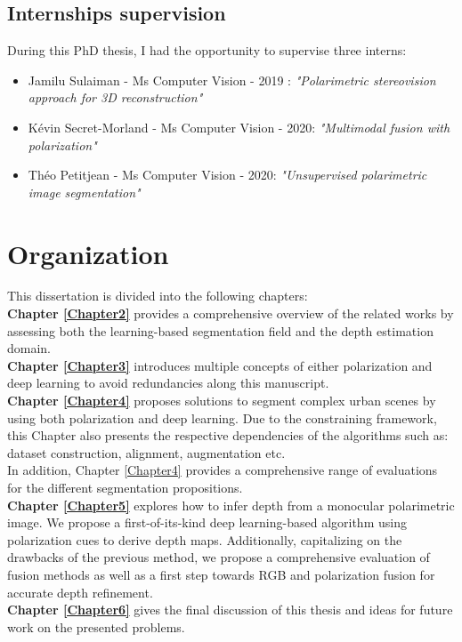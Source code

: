 \subsection{Internships supervision}
During this PhD thesis, I had the opportunity to supervise three interns:
\begin{itemize}
	\item Jamilu Sulaiman - Ms Computer Vision - 2019 : \textit{"Polarimetric stereovision approach for 3D reconstruction"}
	\item K{\'e}vin Secret-Morland - Ms Computer Vision - 2020: \textit{"Multimodal fusion with polarization"}
	\item Th{\'e}o Petitjean - Ms Computer Vision - 2020: \textit{"Unsupervised polarimetric image segmentation"}
\end{itemize}

\section{Organization}
This dissertation is divided into the following chapters:\\
\textbf{Chapter \ref{Chapter2}} provides a comprehensive overview of the related works by assessing both the learning-based segmentation field and the depth estimation domain.\\
\textbf{Chapter \ref{Chapter3}} introduces multiple concepts of either polarization and deep learning to avoid redundancies along this manuscript.\\
\textbf{Chapter \ref{Chapter4}} proposes solutions to segment complex urban scenes by using both polarization and deep learning. Due to the constraining framework, this Chapter also presents the respective dependencies of the algorithms such as: dataset construction, alignment, augmentation etc.\\
In addition, Chapter \ref{Chapter4} provides a comprehensive range of evaluations for the different segmentation propositions.\\
\textbf{Chapter \ref{Chapter5}} explores how to infer depth from a monocular polarimetric image. We propose a first-of-its-kind deep learning-based algorithm using polarization cues to derive depth maps. Additionally, capitalizing on the drawbacks of the previous method, we propose a comprehensive evaluation of fusion methods as well as a first step towards RGB and polarization fusion for accurate depth refinement.\\
\textbf{Chapter \ref{Chapter6}} gives the final discussion of this thesis and ideas for future work on the presented problems.


